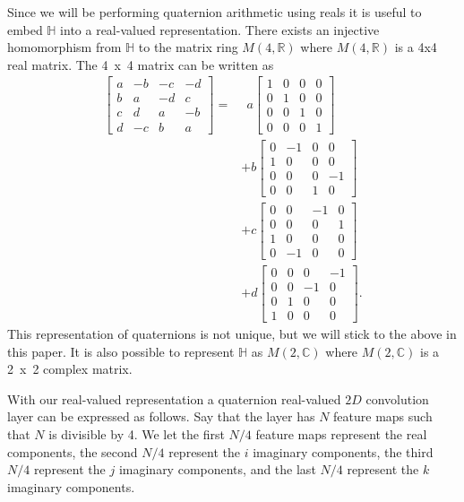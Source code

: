 \documentclass[conference]{IEEEtran}
\begin{document}
Since we will be performing quaternion arithmetic using reals it is useful to embed $\mathbb{H}$ into a real-valued representation.
There exists an injective homomorphism from $\mathbb{H}$ to the matrix ring $M(4,\mathbb{R})$ where $M(4,\mathbb{R})$ is a 4x4 real matrix.
The 4~x~4 matrix can be written as
\begin{align}
\begin{bmatrix}
 a & -b & -c & -d \\ 
 b & a & -d & c \\
 c & d & a & -b \\
 d & -c & b & a 
\end{bmatrix}= &~~a
\begin{bmatrix}
 1 & 0 & 0 & 0 \\ 
 0 & 1 & 0 & 0 \\
 0 & 0 & 1 & 0 \\
 0 & 0 & 0 & 1 
\end{bmatrix}
\nonumber \\ &+ b 
\begin{bmatrix}
 0 & -1 & 0 & 0 \\ 
 1 & 0 & 0 & 0 \\
 0 & 0 & 0 & -1 \\
 0 & 0 & 1 & 0 
\end{bmatrix}
\nonumber \\ &+ c
\begin{bmatrix}
 0 & 0 & -1 & 0 \\ 
 0 & 0 & 0 & 1 \\
 1 & 0 & 0 & 0 \\
 0 & -1 & 0 & 0 
\end{bmatrix}
\nonumber \\ &+ d
\begin{bmatrix}
 0 & 0 & 0 & -1 \\ 
 0 & 0 & -1 & 0 \\
 0 & 1 & 0 & 0 \\
 1 & 0 & 0 & 0 
\end{bmatrix}.
\label{eq:m4r}
\end{align}
This representation of quaternions is not unique, but we will stick to the above in this paper.
It is also possible to represent $\mathbb{H}$ as $M(2,\mathbb{C})$ where $M(2,\mathbb{C})$ is a 2~x~2 complex matrix.

With our real-valued representation a quaternion real-valued $2D$ convolution layer can be expressed as follows. 
Say that the layer has $N$ feature maps such that $N$ is divisible by 4.
We let the first $N/4$ feature maps represent the real components, the second $N/4$ represent the $i$ imaginary components, the third $N/4$ represent the $j$ imaginary components, and the last $N/4$ represent the $k$ imaginary components.
\end{document}
